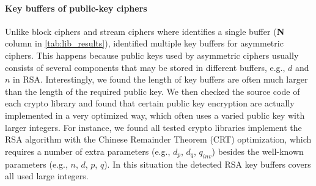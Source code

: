 \paragraph{Key buffers of public-key ciphers} 
Unlike block ciphers and stream ciphers where \sysname identifies a single buffer (\textbf{N} column in \autoref{tab:lib_results}), 
 \sysname identified multiple key buffers for asymmetric ciphers.
This happens because public keys used by asymmetric ciphers usually consists of several components that may be stored in different buffers, 
e.g., $d$ and $n$ in \textsf{\small RSA}. %
%
Interestingly, we found the length of key buffers are often much larger than the length of the required public key. 
We then checked the source code of each crypto library and found that certain public key encryption are actually implemented in a very optimized way, which often uses a varied public key with larger integers. 
For instance, we found all tested crypto libraries implement the \textsf{\small RSA} algorithm with the Chinese Remainder Theorem (CRT) optimization, which requires a number of extra parameters (e.g., $d_p$, $d_q$, $q_{inv}$) besides the well-known parameters (e.g., $n$, $d$, $p$, $q$). 
In this situation the detected \textsf{\small RSA} key buffers covers all used large integers.

